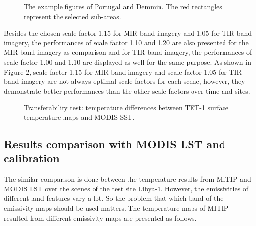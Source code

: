 \begin{figure}[!htbp]
\centering
{}
\vspace{0.5in}
\caption{The example figures of Portugal and Demmin. The red rectangles represent the selected sub-areas.}
\label{fig:portugal&demmin}
\end{figure}

\noindent Besides the chosen scale factor 1.15 for MIR band imagery and 1.05 for TIR band imagery, the performances of scale factor 1.10 and 1.20 are also presented for the MIR band imagery as comparison and for TIR band imagery, the performances of scale factor 1.00 and 1.10 are displayed as well for the same purpose. As shown in Figure \ref{fig:SST_test}, scale factor 1.15 for MIR band imagery and scale factor 1.05 for TIR band imagery are not always optimal scale factors for each scene, however, they demonstrate better performances than the other scale factors over time and sites.\\

\begin{figure}[!htbp]
\centering
{}
\hspace{0.5in}
\caption{Transferability test: temperature differences between TET-1 surface temperature maps and MODIS SST.}
\label{fig:SST_test}
\end{figure}


\subsection{Results comparison with MODIS LST and calibration}
The similar comparison is done between the temperature results from MITIP and MODIS LST over the scenes of the test site Libya-1. However, the emissivities of different land features vary a lot. So the problem that which band of the emissivity maps should be used matters. The temperature maps of MITIP resulted from different emissivity maps are presented as follows.\\

